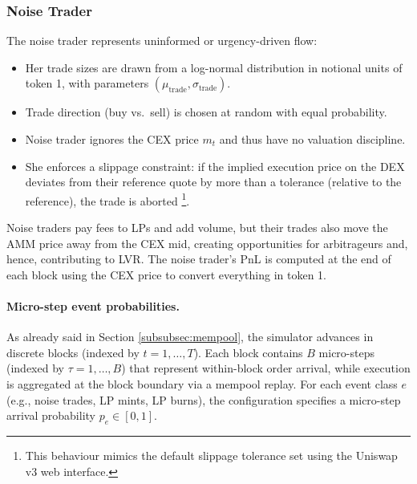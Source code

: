 \documentclass[11pt]{article}
\begin{document}
\subsubsection{Noise Trader}



The noise trader represents uninformed or urgency-driven flow:
\begin{itemize}[leftmargin=*]
  \item Her trade sizes are drawn from a log-normal distribution in notional units of
        token 1, with parameters $(\mu_{\mathrm{trade}},\sigma_{\mathrm{trade}})$.
  \item Trade direction (buy vs.\ sell) is chosen at random with equal probability.
  \item Noise trader ignores the CEX price $m_t$ and thus have no valuation discipline.
  \item She enforces a slippage constraint: if the implied execution price on the DEX deviates
        from their reference quote by more than a tolerance (relative to the reference),
        the trade is aborted \footnote{This behaviour mimics the default slippage tolerance set using the Uniswap v3 web interface.}.
\end{itemize}

Noise traders pay fees to LPs and add volume, but their trades also move the AMM price away
from the CEX mid, creating opportunities for arbitrageurs and, hence, contributing to LVR. The noise trader's PnL is computed at the end of each block using the CEX price to convert everything in token 1.


\paragraph{Micro-step event probabilities.}
As already said in Section \ref{subsubsec:mempool}, the simulator advances in discrete blocks (indexed by $t=1,\dots,T$). Each block contains $B$ micro-steps (indexed by $\tau=1,\dots, B$) that represent within-block order arrival, while execution is aggregated at the block boundary via a mempool replay. For each event class $e$ (e.g., noise trades, LP mints, LP burns), the configuration specifies a micro-step arrival probability $p_e\in[0,1]$.
\end{document}
